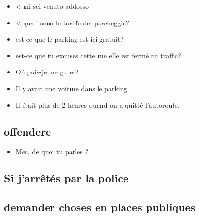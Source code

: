 \begin{itemize}

\item <-mi sei venuto addosso

\item <-quali sono le tariffe del parcheggio?

\item est-ce que le parking est ici gratuit?

\item est-ce que tu excuses cette rue elle est ferm\'e au traffic?

\item O\'u puis-je me garer?

\item Il y avait une voiture dans le parking.

\item Il \'etait plus de 2 heures quand on a quitt\'e l'autoroute.

\end{itemize}

\subsection{offendere}

\begin{itemize}

\item Mec, de quoi tu parles ?

\end{itemize} 

\subsection{Si j'arr\^et\'es par la police}

\subsection{demander choses en places publiques}

